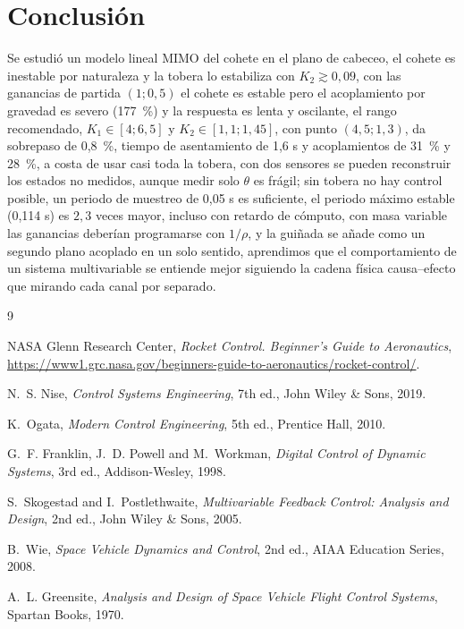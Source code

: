 \documentclass[article, 11pt]{IEEEtran}   %
\begin{document}
\section{Conclusi\'on}
Se estudi\'o un modelo lineal MIMO del cohete en el plano de cabeceo, el cohete es inestable por naturaleza y la tobera lo estabiliza con $K_2\gtrsim0{,}09$, con las ganancias de partida $(1;0{,}5)$ el cohete es estable pero el acoplamiento por gravedad es severo (177~\%) y la respuesta es lenta y oscilante, el rango recomendado, $K_1\in[4;6{,}5]$ y $K_2\in[1{,}1;1{,}45]$, con punto $(4{,}5;1{,}3)$, da sobrepaso de 0,8~\%, tiempo de asentamiento de 1,6 s y acoplamientos de 31~\% y 28~\%, a costa de usar casi toda la tobera, con dos sensores se pueden reconstruir los estados no medidos, aunque medir solo $\theta$ es fr\'agil; sin tobera no hay control posible, un periodo de muestreo de 0,05 s es suficiente, el periodo m\'aximo estable (0,114 s) es $2{,}3$ veces mayor, incluso con retardo de c\'omputo, con masa variable las ganancias deber\'ian programarse con $1/\rho$, y la gui\~nada se a\~nade como un segundo plano acoplado en un solo sentido, aprendimos que el comportamiento de un sistema multivariable se entiende mejor siguiendo la cadena f\'isica causa--efecto que mirando cada canal por separado.

\begin{thebibliography}{9}

NASA Glenn Research Center, \emph{Rocket Control. Beginner's Guide to Aeronautics}, \url{https://www1.grc.nasa.gov/beginners-guide-to-aeronautics/rocket-control/}.

N.~S. Nise, \emph{Control Systems Engineering}, 7th ed., John Wiley \& Sons, 2019.

K.~Ogata, \emph{Modern Control Engineering}, 5th ed., Prentice Hall, 2010.

G.~F. Franklin, J.~D. Powell and M.~Workman, \emph{Digital Control of Dynamic Systems}, 3rd ed., Addison-Wesley, 1998.

S.~Skogestad and I.~Postlethwaite, \emph{Multivariable Feedback Control: Analysis and Design}, 2nd ed., John Wiley \& Sons, 2005.

B.~Wie, \emph{Space Vehicle Dynamics and Control}, 2nd ed., AIAA Education Series, 2008.

A.~L. Greensite, \emph{Analysis and Design of Space Vehicle Flight Control Systems}, Spartan Books, 1970.

\end{thebibliography}
\end{document}
